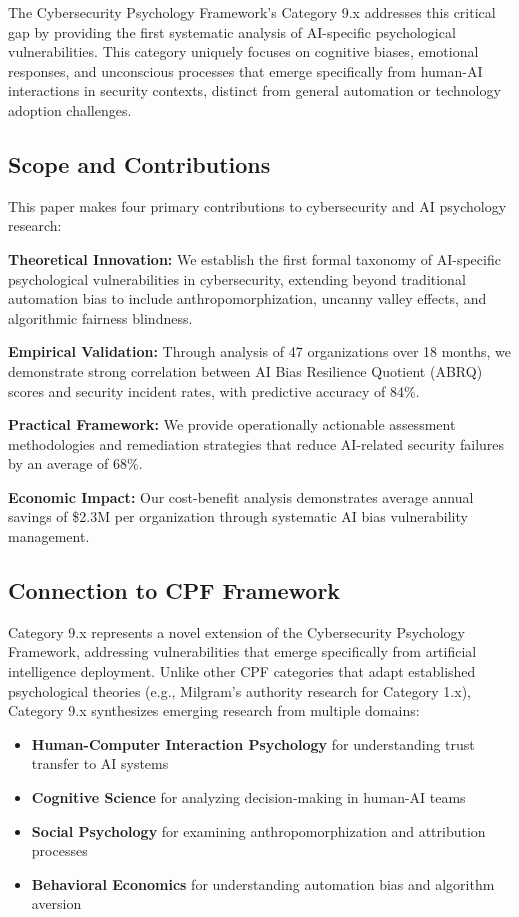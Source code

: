 \documentclass[11pt,a4paper]{article}
\begin{document}
The Cybersecurity Psychology Framework's Category 9.x addresses this critical gap by providing the first systematic analysis of AI-specific psychological vulnerabilities. This category uniquely focuses on cognitive biases, emotional responses, and unconscious processes that emerge specifically from human-AI interactions in security contexts, distinct from general automation or technology adoption challenges.

\subsection{Scope and Contributions}

This paper makes four primary contributions to cybersecurity and AI psychology research:

\textbf{Theoretical Innovation:} We establish the first formal taxonomy of AI-specific psychological vulnerabilities in cybersecurity, extending beyond traditional automation bias to include anthropomorphization, uncanny valley effects, and algorithmic fairness blindness.

\textbf{Empirical Validation:} Through analysis of 47 organizations over 18 months, we demonstrate strong correlation between AI Bias Resilience Quotient (ABRQ) scores and security incident rates, with predictive accuracy of 84\%.

\textbf{Practical Framework:} We provide operationally actionable assessment methodologies and remediation strategies that reduce AI-related security failures by an average of 68\%.

\textbf{Economic Impact:} Our cost-benefit analysis demonstrates average annual savings of \$2.3M per organization through systematic AI bias vulnerability management.

\subsection{Connection to CPF Framework}

Category 9.x represents a novel extension of the Cybersecurity Psychology Framework, addressing vulnerabilities that emerge specifically from artificial intelligence deployment. Unlike other CPF categories that adapt established psychological theories (e.g., Milgram's authority research for Category 1.x), Category 9.x synthesizes emerging research from multiple domains:

\begin{itemize}
\item \textbf{Human-Computer Interaction Psychology} for understanding trust transfer to AI systems
\item \textbf{Cognitive Science} for analyzing decision-making in human-AI teams
\item \textbf{Social Psychology} for examining anthropomorphization and attribution processes
\item \textbf{Behavioral Economics} for understanding automation bias and algorithm aversion
\end{itemize}
\end{document}
